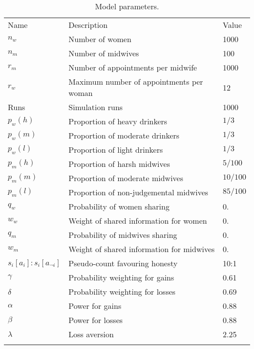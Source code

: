\begin{table}[h!]
\caption[Midwives and women disclosure game model parameters]{Model parameters.} 
\label{tab:qt_params}
\begin{tabular} {lll}
\hline\noalign{\smallskip}
Name & Description & Value \\
\noalign{\smallskip}\svhline\noalign{\smallskip}
\(n_{w}\) & Number of women & 1000 \\ 
\(n_{m}\) & Number of midwives & 100 \\ 
\(r_{m}\) & Number of appointments per midwife & 1000 \\ 
\(r_{w}\) & Maximum number of appointments per woman & 12 \\ 
Runs & Simulation runs & 1000 \\ 
\(p_{w}(h)\) & Proportion of heavy drinkers & \(1/3\) \\ 
\(p_{w}(m)\) & Proportion of moderate drinkers & \(1/3\) \\ 
\(p_{w}(l)\) & Proportion of light drinkers & \(1/3\) \\ 
\(p_{m}(h)\) & Proportion of harsh midwives & \(5/100\) \\ 
\(p_{m}(m)\) & Proportion of moderate midwives & \(10/100\) \\ 
\(p_{m}(l)\) & Proportion of non-judgemental midwives & \(85/100\) \\ 
\(q_{w}\) & Probability of women sharing & 0. \\ 
\(w_{w}\) & Weight of shared information for women & 0. \\ 
\(q_{m}\) & Probability of midwives sharing & 0. \\ 
\(w_{m}\) & Weight of shared information for midwives & 0. \\ 
\(s_{i}[a_{i}]:s_{i}[a_{\neg i}]\) & Pseudo-count favouring honesty\footnotemark & 10:1 \\ 
\(\gamma\) & Probability weighting for gains  & 0.61 \\ 
\(\delta\) & Probability weighting for losses &  0.69\\ 
\(\alpha\) & Power for gains  & 0.88 \\ 
\(\beta\) & Power for losses & 0.88 \\ 
\(\lambda\) & Loss aversion &  2.25 \\
\noalign{\smallskip}\hline\noalign{\smallskip}
\end{tabular}
\end{table}

